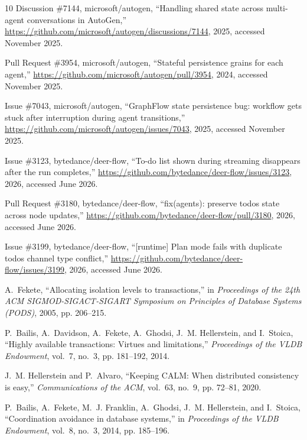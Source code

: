 \documentclass[journal,compsoc,10pt]{IEEEtran}
\theoremstyle{definition}
\theoremstyle{remark}
\begin{document}
\begin{thebibliography}{10}
{Discussion \#7144, microsoft/autogen}, ``Handling shared state across
  multi-agent conversations in {AutoGen},''
  \url{https://github.com/microsoft/autogen/discussions/7144}, 2025, accessed
  November 2025.

{Pull Request \#3954, microsoft/autogen}, ``Stateful persistence grains for
  each agent,'' \url{https://github.com/microsoft/autogen/pull/3954}, 2024,
  accessed November 2025.

{Issue \#7043, microsoft/autogen}, ``{GraphFlow} state persistence bug:
  workflow gets stuck after interruption during agent transitions,''
  \url{https://github.com/microsoft/autogen/issues/7043}, 2025, accessed
  November 2025.

{Issue \#3123, bytedance/deer-flow}, ``To-do list shown during streaming
  disappears after the run completes,''
  \url{https://github.com/bytedance/deer-flow/issues/3123}, 2026, accessed
  June 2026.

{Pull Request \#3180, bytedance/deer-flow}, ``fix(agents): preserve todos
  state across node updates,''
  \url{https://github.com/bytedance/deer-flow/pull/3180}, 2026, accessed
  June 2026.

{Issue \#3199, bytedance/deer-flow}, ``[runtime] Plan mode fails with
  duplicate todos channel type conflict,''
  \url{https://github.com/bytedance/deer-flow/issues/3199}, 2026, accessed
  June 2026.

A.~Fekete, ``Allocating isolation levels to transactions,'' in
  \emph{Proceedings of the 24th {ACM} {SIGMOD-SIGACT-SIGART} Symposium on
  Principles of Database Systems ({PODS})}, 2005, pp. 206--215.

P.~Bailis, A.~Davidson, A.~Fekete, A.~Ghodsi, J.~M. Hellerstein, and I.~Stoica,
  ``Highly available transactions: Virtues and limitations,'' \emph{Proceedings
  of the {VLDB} Endowment}, vol.~7, no.~3, pp. 181--192, 2014.

J.~M. Hellerstein and P.~Alvaro, ``Keeping {CALM}: When distributed consistency
  is easy,'' \emph{Communications of the ACM}, vol.~63, no.~9, pp. 72--81,
  2020.

P.~Bailis, A.~Fekete, M.~J. Franklin, A.~Ghodsi, J.~M. Hellerstein, and
  I.~Stoica, ``Coordination avoidance in database systems,'' in \emph{Proceedings
  of the {VLDB} Endowment}, vol.~8, no.~3, 2014, pp. 185--196.


\end{thebibliography}
\end{document}
